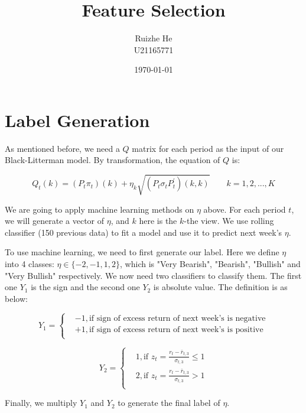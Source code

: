 \documentclass{article}
\title{Feature Selection}
\author{Ruizhe He \\ U21165771}
\date{\today}
\begin{document}
\maketitle

\section{Label Generation}

As mentioned before, we need a $Q$ matrix for each period as the input of our Black-Litterman model. By transformation, the equation of $Q$ is:

\begin{equation}
Q_t(k)=(P_t \pi_t)(k)+\eta_k\sqrt{(P_t \sigma_t P_t^{'})(k,k)} \quad\quad k=1,2,...,K
\label{Qeta}
\end{equation}

We are going to apply machine learning methods on $\eta$ above. For each period $t$, we will generate a vector of $\eta$, and $k$ here is the $k$-the view. We use rolling classifier (150 previous data) to fit a model and use it to predict next week's $\eta$.

To use machine learning, we need to first generate our label. Here we define $\eta$ into 4 classes: $\eta\in\{-2,-1,1,2\}$, which is "Very Bearish", "Bearish", "Bullish" and "Very Bullish" respectively. We now need two classifiers to classify them. The first one $Y_1$ is the sign and the second one $Y_2$ is absolute value. The definition is as below:

\begin{equation}
Y_1=\left\{
	\begin{aligned}
	&-1, \text{if sign of excess return of next week's is negative} \\
	&+1, \text{if sign of excess return of next week's is positive} \\
	\end{aligned}
\right.
\label{y1}
\end{equation}

\begin{equation}
Y_2=\left\{
	\begin{aligned}
	&1, \text{if }z_t=\frac{r_t-\bar{r}_{t,3}}{\sigma_{t,3}}\leq 1\\
	&2, \text{if }z_t=\frac{r_t-\bar{r}_{t,3}}{\sigma_{t,3}}>1 \\
	\end{aligned}
\right.
\label{y2}
\end{equation}

Finally, we multiply $Y_1$ and $Y_2$ to generate the final label of $\eta$.
\end{document}
